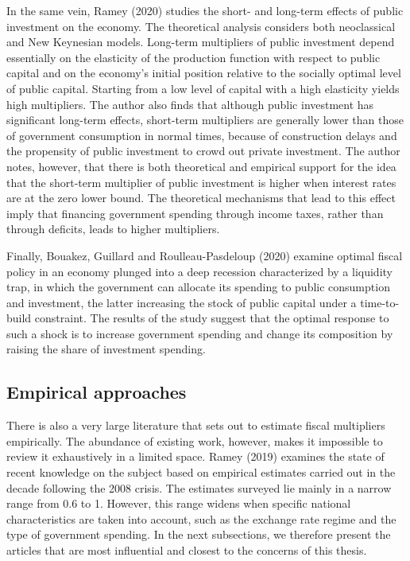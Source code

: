 \documentclass[12pt,letterpaper]{article}
\begin{document}
In the same vein, Ramey (2020) studies the short- and long-term effects of public investment on the economy. The theoretical analysis considers both neoclassical and New Keynesian models. Long-term multipliers of public investment depend essentially on the elasticity of the production function with respect to public capital and on the economy's initial position relative to the socially optimal level of public capital. Starting from a low level of capital with a high elasticity yields high multipliers. The author also finds that although public investment has significant long-term effects, short-term multipliers are generally lower than those of government consumption in normal times, because of construction delays and the propensity of public investment to crowd out private investment. The author notes, however, that there is both theoretical and empirical support for the idea that the short-term multiplier of public investment is higher when interest rates are at the zero lower bound. The theoretical mechanisms that lead to this effect imply that financing government spending through income taxes, rather than through deficits, leads to higher multipliers.

Finally, Bouakez, Guillard and Roulleau-Pasdeloup (2020) examine optimal fiscal policy in an economy plunged into a deep recession characterized by a liquidity trap, in which the government can allocate its spending to public consumption and investment, the latter increasing the stock of public capital under a time-to-build constraint. The results of the study suggest that the optimal response to such a shock is to increase government spending and change its composition by raising the share of investment spending.

\subsection{Empirical approaches}

There is also a very large literature that sets out to estimate fiscal multipliers empirically. The abundance of existing work, however, makes it impossible to review it exhaustively in a limited space. Ramey (2019) examines the state of recent knowledge on the subject based on empirical estimates carried out in the decade following the 2008 crisis. The estimates surveyed lie mainly in a narrow range from 0.6 to 1. However, this range widens when specific national characteristics are taken into account, such as the exchange rate regime and the type of government spending. In the next subsections, we therefore present the articles that are most influential and closest to the concerns of this thesis.
\end{document}
